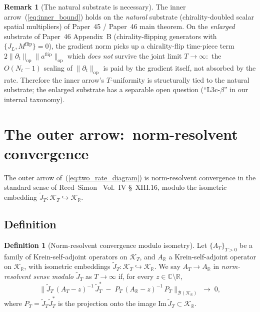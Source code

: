 \documentclass[11pt,a4paper]{article}
\theoremstyle{plain}
\theoremstyle{definition}
\newtheorem{definition}[theorem]{Definition}
\newtheorem{remark}[theorem]{Remark}
\newcommand{\Nt}{N_{t}}
\newcommand{\Krein}{\mathcal{K}}
\newcommand{\Bcal}{\mathcal{B}}
\newcommand{\opnorm}[1]{\lVert #1 \rVert_{\mathrm{op}}}
\newcommand{\R}{\mathbb{R}}
\newcommand{\C}{\mathbb{C}}
\newcommand{\JL}{J_{L}}
\newcommand{\JT}{\widetilde{J}_{T}}
\newcommand{\flip}{\mathrm{flip}}
\begin{document}
\begin{remark}[The natural substrate is necessary]
The inner arrow~(\ref{eq:inner_bound}) holds on the
\emph{natural} substrate (chirality-doubled scalar spatial multipliers)
of Paper~45 / Paper~46 main theorem. On the \emph{enlarged} substrate
of Paper~46 Appendix~B (chirality-flipping generators with
$\{\JL, M^{\flip}\} = 0$), the gradient norm picks up a chirality-flip
time-piece term $2\opnorm{\partial_{t}} \opnorm{a^{\flip}}$ which
\emph{does not} survive the joint limit $T \to \infty$:\ the
$O(\Nt - 1)$ scaling of $\opnorm{\partial_{t}}$ is paid by the gradient
itself, not absorbed by the rate. Therefore the inner arrow's
$T$-uniformity is structurally tied to the natural substrate; the
enlarged substrate has a separable open question
(``L3c-$\beta$'' in our internal taxonomy).
\end{remark}

\section{The outer arrow:\ norm-resolvent convergence}\label{sec:outer}

The outer arrow of~(\ref{eq:two_rate_diagram}) is norm-resolvent
convergence in the standard sense of Reed--Simon~\cite{reed_simon_iv}
Vol.~IV \S~XIII.16, modulo the isometric embedding
$\JT : \Krein_{T} \hookrightarrow \Krein_{\R}$.

\subsection{Definition}\label{sec:nr_definition}

\begin{definition}[Norm-resolvent convergence modulo isometry]
\label{def:nr_convergence}
Let $\{A_{T}\}_{T > 0}$ be a family of Krein-self-adjoint operators on
$\Krein_{T}$, and $A_{\R}$ a Krein-self-adjoint operator on
$\Krein_{\R}$, with isometric embeddings
$\JT : \Krein_{T} \hookrightarrow \Krein_{\R}$. We say $A_{T} \to
A_{\R}$ in \emph{norm-resolvent sense modulo $\JT$} as $T \to \infty$
if, for every $z \in \C \setminus \R$,
\begin{equation}\label{eq:nr_def}
\bigl\| \JT\,(A_{T} - z)^{-1}\,\JT^{*} \;-\; P_{T}\,(A_{\R} - z)^{-1}\,
P_{T} \bigr\|_{\Bcal(\Krein_{\R})} \;\to\; 0,
\end{equation}
where $P_{T} = \JT \JT^{*}$ is the projection onto the image
$\mathrm{Im}\,\JT \subset \Krein_{\R}$.
\end{definition}
\end{document}

